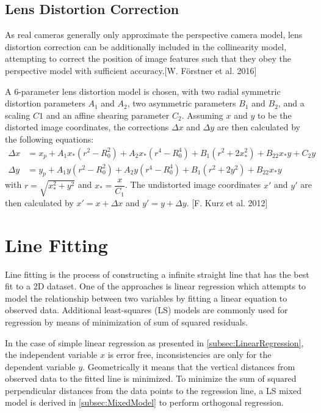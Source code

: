 \subsection{Lens Distortion Correction}
\label{subsec:LensDistortion}

As real cameras generally only approximate the perspective camera model, lens distortion correction can be additionally included in the collinearity model, attempting to correct the position of image features such that they obey the perspective model with sufficient accuracy.[W. Förstner et al. 2016] 

A 6-parameter lens distortion model is chosen, with two radial symmetric distortion parameters $A_1$ and $A_2$, two asymmetric parameters $B_1$ and $B_2$, and a scaling $C1$ and an affine shearing parameter $C_2$. Assuming $x$ and $y$ to be the distorted image coordinates, the corrections $\Delta x$ and $\Delta y$ are then calculated by the following equations:
\begin{equation} \label{eq:LensDistortion}
\begin{split}
\Delta x &= x_p + A_1x_*(r^2-R_0^2) + A_2x_*(r^4-R_0^4) + B_1(r^2+2x_*^2) + B_22x_*y+C_2y \\
\Delta y &= y_p + A_1y  (r^2-R_0^2) + A_2y  (r^4-R_0^4) + B_1(r^2+2y^2)   + B_22x_*y
\end{split}
\end{equation}
with $r=\sqrt{x_*^2+y^2}$ and $x_*=\dfrac{x}{C_1}$. The undistorted image coordinates $x\prime$ and $y\prime$ are then calculated by $x\prime=x+\Delta x$ and $y\prime=y+\Delta y$. [F. Kurz et al. 2012] 


\section{Line Fitting}
\label{sec:LineFitting}

Line fitting is the process of constructing a infinite straight line that has the best fit to a 2D dataset. One of the approaches is linear regression which attempts to model the relationship between two variables by fitting a linear equation to observed data. %
Additional least-squares (LS) models are commonly used for regression by means of minimization of sum of squared residuals.

In the case of simple linear regression as presented in \cref{subsec:LinearRegression}, the independent variable $x$ is error free, inconsistencies are only for the dependent variable $y$. Geometrically it means that the vertical distances from observed data to the fitted line is minimized. To minimize the sum of squared perpendicular distances from the data points to the regression line, a LS mixed model is derived in \cref{subsec:MixedModel} to perform orthogonal regression.

